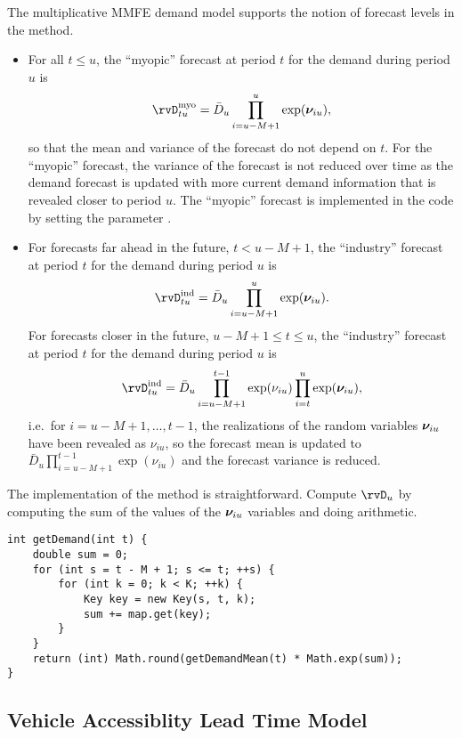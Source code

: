 The multiplicative MMFE demand model
supports the notion of forecast levels
in the  method.
\begin{itemize}
\item
For all $t \leq u$,
the ``myopic'' forecast at period $t$ for the demand during period $u$ is
\[
    \rvD_{tu}^{\text{myo}}
  =
    \bar{D}_u \prod_{i=u-M+1}^u \exp(\rvnu_{iu}),
\]
so that the mean and variance of the forecast do not depend on $t$.
For the ``myopic'' forecast,
the variance of the forecast is not reduced over time
as the demand forecast is updated with more current demand information
that is revealed closer to period $u$.
The ``myopic'' forecast is implemented in the code
by setting the parameter .

\item
For forecasts far ahead in the future, $t < u - M + 1$,
the ``industry'' forecast at period $t$ for the demand during period $u$ is
\[
    \rvD_{tu}^{\text{ind}}
  =
    \bar{D}_u \prod_{i=u-M+1}^u \exp(\rvnu_{iu}).
\]
For forecasts closer in the future, $u - M + 1 \leq t \leq u$,
the ``industry'' forecast at period $t$ for the demand during period $u$ is
\[
    \rvD_{tu}^{\text{ind}}
  =
    \bar{D}_u
    \prod_{i=u-M+1}^{t-1} \exp(\nu_{iu})
    \prod_{i=t}^u \exp(\rvnu_{iu}),
\]
i.e.\ for $i = u-M+1,\ldots,t-1$,
the realizations of the random variables $\bm{\nu}_{iu}$
have been revealed as $\nu_{iu}$,
so the forecast mean is updated to
$\bar{D}_u \prod_{i=u-M+1}^{t-1} \exp(\nu_{iu})$
and the forecast variance is reduced.

\end{itemize}

The implementation of the  method is straightforward.
Compute $\rvD_u$
by computing the sum of the values of the $\bm{\nu}_{iu}$ variables
and doing arithmetic.
\begin{lstlisting}
int getDemand(int t) {
    double sum = 0;
    for (int s = t - M + 1; s <= t; ++s) {
        for (int k = 0; k < K; ++k) {
            Key key = new Key(s, t, k);
            sum += map.get(key);
        }
    }
    return (int) Math.round(getDemandMean(t) * Math.exp(sum));
}
\end{lstlisting}





\subsection{Vehicle Accessiblity Lead Time Model}

